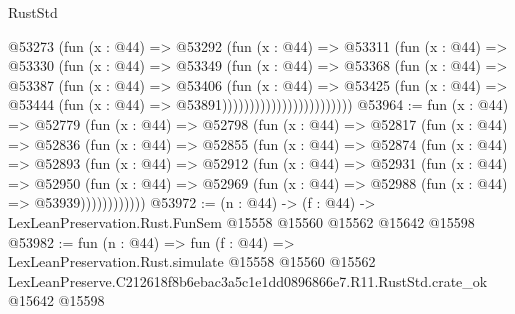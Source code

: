 \begin{lexlean}{RustStd}
\begin{coremodule}
                              @53273
                                (fun (x : @44) =>
                                @53292
                                  (fun (x : @44) =>
                                  @53311
                                    (fun (x : @44) =>
                                    @53330
                                      (fun (x : @44) =>
                                      @53349
                                        (fun (x : @44) =>
                                        @53368
                                          (fun (x : @44) =>
                                          @53387
                                            (fun (x : @44) =>
                                            @53406
                                              (fun (x : @44) =>
                                              @53425
                                                (fun (x : @44) =>
                                                @53444
                                                  (fun (x : @44) => @53891))))))))))))))))))))))))
@53964 := fun (x : @44) =>
  @52779
    (fun (x : @44) =>
    @52798
      (fun (x : @44) =>
      @52817
        (fun (x : @44) =>
        @52836
          (fun (x : @44) =>
          @52855
            (fun (x : @44) =>
            @52874
              (fun (x : @44) =>
              @52893
                (fun (x : @44) =>
                @52912
                  (fun (x : @44) =>
                  @52931
                    (fun (x : @44) =>
                    @52950
                      (fun (x : @44) =>
                      @52969 (fun (x : @44) => @52988 (fun (x : @44) => @53939))))))))))))
@53972 := (n : @44) ->
  (f : @44) -> LexLeanPreservation.Rust.FunSem @15558 @15560 @15562 @15642 @15598
@53982 := fun (n : @44) =>
  fun (f : @44) =>
  LexLeanPreservation.Rust.simulate
    @15558
    @15560
    @15562
    LexLeanPreserve.C212618f8b6ebac3a5c1e1dd0896866e7.R11.RustStd.crate_ok
    @15642
    @15598
\end{coremodule}
\end{lexlean}
